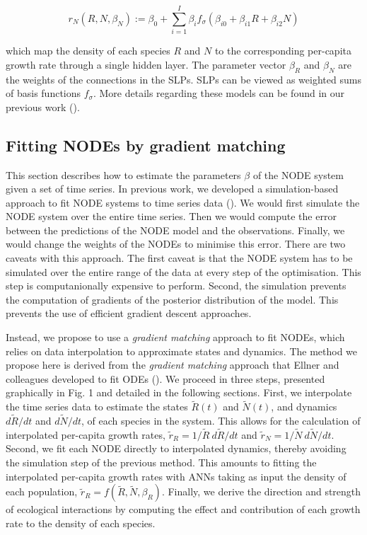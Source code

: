 \documentclass[11pt, oneside]{article}
\begin{document}
\begin{equation}
    r_N(R, N, \beta_N) := \beta_0 + \sum_{i=1}^{I} \beta_{i} f_{\sigma} \left( \beta_{i0} + \beta_{i1} R + \beta_{i2} N \right) 
\end{equation}

which map the density of each species $R$ and $N$ to the corresponding per-capita growth rate through a single hidden layer.
The parameter vector $\beta_R$ and $\beta_N$ are the weights of the connections in the SLPs.
SLPs can be viewed as weighted sums of basis functions $f_\sigma$.
More details regarding these models can be found in our previous work (\cite{Bonnaffe2021a}).

\subsection{Fitting NODEs by gradient matching}

This section describes how to estimate the parameters $\beta$ of the NODE system given a set of time series.
In previous work, we developed a simulation-based approach to fit NODE systems to time series data (\cite{Bonnaffe2021a}).
We would first simulate the NODE system over the entire time series.
Then we would compute the error between the predictions of the NODE model and the observations. 
Finally, we would change the weights of the NODEs to minimise this error. 
There are two caveats with this approach.
The first caveat is that the NODE system has to be simulated over the entire range of the data at every step of the optimisation.
This step is computanionally expensive to perform.
Second, the simulation prevents the computation of gradients of the posterior distribution of the model.
This prevents the use of efficient gradient descent approaches.

Instead, we propose to use a \textit{gradient matching} approach to fit NODEs, which relies on data interpolation to approximate states and dynamics.
The method we propose here is derived from the \textit{gradient matching} approach that Ellner and colleagues developed to fit ODEs (\cite{Ellner2002, Wu2005}).
We proceed in three steps, presented graphically in Fig. 1 and detailed in the following sections. 
First, we interpolate the time series data to estimate the states $\tilde{R}(t)$ and $\tilde{N}(t)$, and dynamics $d\tilde{R}/dt$ and $d\tilde{N}/dt$, of each species in the system. 
This allows for the calculation of interpolated per-capita growth rates, $\tilde{r}_R = 1/\tilde{R}~d\tilde{R}/dt$ and $\tilde{r}_N = 1/\tilde{N}~d\tilde{N}/dt$.
Second, we fit each NODE directly to interpolated dynamics, thereby avoiding the simulation step of the previous method. 
This amounts to fitting the interpolated per-capita growth rates with ANNs taking as input the density of each population, $\tilde{r}_R = f(\tilde{R},\tilde{N},\beta_R)$.
Finally, we derive the direction and strength of ecological interactions by computing the effect and contribution of each growth rate to the density of each species.
\end{document}
